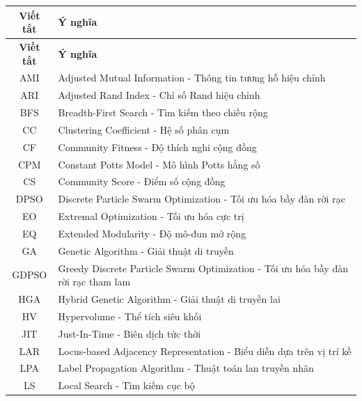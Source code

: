 \documentclass[14pt,a4paper]{extarticle}
\begin{document}
\begin{longtable}{|c|p{}|}

    \hline
    \textbf{Viết tắt} & \textbf{Ý nghĩa} \\ \hline
    \endfirsthead

    \hline
    \textbf{Viết tắt} & \textbf{Ý nghĩa} \\ \hline
    \endhead

    \hline
    \endfoot

    \hline
    \endlastfoot

    AMI & Adjusted Mutual Information - Thông tin tương hỗ hiệu chỉnh \\ \hline
    ARI & Adjusted Rand Index - Chỉ số Rand hiệu chỉnh \\ \hline
    BFS & Breadth-First Search - Tìm kiếm theo chiều rộng \\ \hline
    CC & Clustering Coefficient - Hệ số phân cụm \\ \hline
    CF & Community Fitness - Độ thích nghi cộng đồng \\ \hline
    CPM & Constant Potts Model - Mô hình Potts hằng số \\ \hline
    CS & Community Score - Điểm số cộng đồng \\ \hline
    DPSO & Discrete Particle Swarm Optimization - Tối ưu hóa bầy đàn rời rạc \\ \hline
    EO & Extremal Optimization - Tối ưu hóa cực trị \\ \hline
    EQ & Extended Modularity - Độ mô-đun mở rộng \\ \hline
    GA & Genetic Algorithm - Giải thuật di truyền \\ \hline
    GDPSO & Greedy Discrete Particle Swarm Optimization - Tối ưu hóa bầy đàn rời rạc tham lam \\ \hline
    HGA & Hybrid Genetic Algorithm - Giải thuật di truyền lai \\ \hline
    HV & Hypervolume - Thể tích siêu khối \\ \hline
    JIT & Just-In-Time - Biên dịch tức thời \\ \hline
    LAR & Locus-based Adjacency Representation - Biểu diễn dựa trên vị trí kề \\ \hline
    LPA & Label Propagation Algorithm - Thuật toán lan truyền nhãn \\ \hline
    LS & Local Search - Tìm kiếm cục bộ \\ \hline

\end{longtable}
\end{document}

